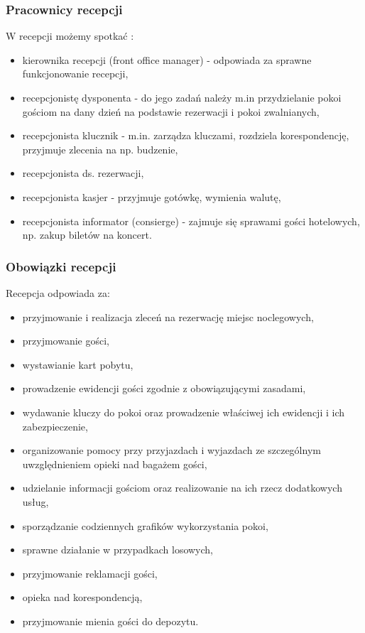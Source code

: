 \documentclass[a4paper,onecolumn,oneside,11pt,wide,floatssmall]{mwrep}
\theoremstyle{definition}
\theoremstyle{plain}%
\theoremstyle{remark}
\begin{document}
\subsubsection{Pracownicy recepcji}
W recepcji możemy spotkać \cite[47-51]{OrgaDzialHot}:

\begin{itemize}
  \item kierownika recepcji (front office manager) - odpowiada za sprawne 
  funkcjonowanie recepcji,
  \item recepcjonistę dysponenta - do jego zadań należy m.in przydzielanie 
  pokoi gościom na dany dzień na podstawie rezerwacji i pokoi zwalnianych,
  \item recepcjonista klucznik - m.in. zarządza kluczami, rozdziela 
  korespondencję, przyjmuje zlecenia na np. budzenie,
  \item recepcjonista ds. rezerwacji,
  \item recepcjonista kasjer - przyjmuje gotówkę, wymienia walutę,
  \item recepcjonista informator (consierge) - zajmuje się sprawami gości 
  hotelowych, np. zakup biletów na koncert.
\end{itemize}

\subsubsection{Obowiązki recepcji} 
Recepcja odpowiada za\cite[50]{OrgaDzialHot}:

\begin{itemize}
  \item przyjmowanie i realizacja zleceń na rezerwację miejsc noclegowych,
  \item przyjmowanie gości,
  \item wystawianie kart pobytu,
  \item prowadzenie ewidencji gości zgodnie z obowiązującymi zasadami,
  \item wydawanie kluczy do pokoi oraz prowadzenie właściwej ich ewidencji i 
  ich zabezpieczenie,
  \item organizowanie pomocy przy przyjazdach i wyjazdach ze szczególnym 
  uwzględnieniem opieki nad bagażem gości,
  \item udzielanie informacji gościom oraz realizowanie na ich rzecz 
  dodatkowych usług,
  \item sporządzanie codziennych grafików wykorzystania pokoi,
  \item sprawne działanie w przypadkach losowych,
  \item przyjmowanie reklamacji gości,
  \item opieka nad korespondencją,
  \item przyjmowanie mienia gości do depozytu.
\end{itemize}
\end{document}
